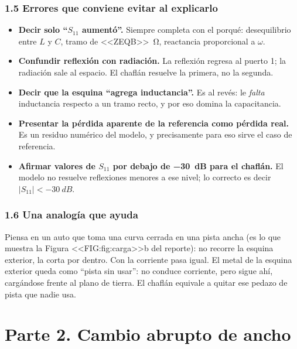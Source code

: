 \documentclass[11pt,letterpaper]{article}
\begin{document}
\section*{1.5 Errores que conviene evitar al explicarlo}
\begin{itemize}
\item \textbf{Decir solo ``$S_{11}$ aumentó''.} Siempre completa con el porqué: desequilibrio entre $L$ y $C$, tramo de \SI{<<ZEQB>>}{\ohm}, reactancia proporcional a $\omega$.
\item \textbf{Confundir reflexión con radiación.} La reflexión regresa al puerto 1; la radiación sale al espacio. El chaflán resuelve la primera, no la segunda.
\item \textbf{Decir que la esquina ``agrega inductancia''.} Es al revés: le \emph{falta} inductancia respecto a un tramo recto, y por eso domina la capacitancia.
\item \textbf{Presentar la pérdida aparente de la referencia como pérdida real.} Es un residuo numérico del modelo, y precisamente para eso sirve el caso de referencia.
\item \textbf{Afirmar valores de $S_{11}$ por debajo de \SI{-30}{dB} para el chaflán.} El modelo no resuelve reflexiones menores a ese nivel; lo correcto es decir $|S_{11}|<\SI{-30}{dB}$.
\end{itemize}

\section*{1.6 Una analogía que ayuda}
Piensa en un auto que toma una curva cerrada en una pista ancha (es lo que muestra la Figura <<FIG:fig:carga>>b del reporte): no recorre la esquina exterior, la corta por dentro. Con la corriente pasa igual. El metal de la esquina exterior queda como ``pista sin usar'': no conduce corriente, pero sigue ahí, cargándose frente al plano de tierra. El chaflán equivale a quitar ese pedazo de pista que nadie usa.


\newpage
\part*{Parte 2. Cambio abrupto de ancho}
\end{document}

